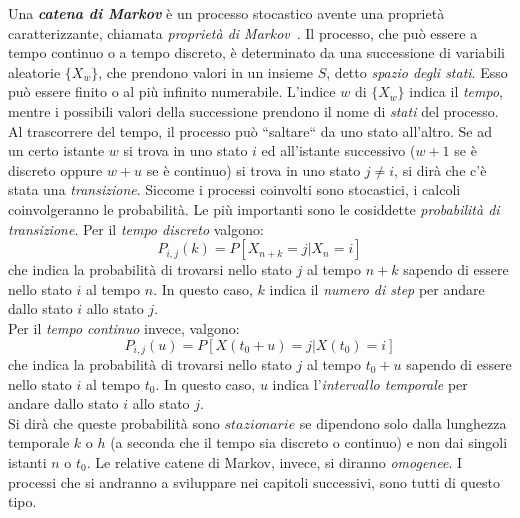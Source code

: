 Una \textit{\textbf{catena di Markov}} \`e un processo stocastico avente una proprietà caratterizzante, chiamata \textit{proprietà di Markov}~\cite{libro:tele}.  Il processo, che può essere a tempo continuo o a tempo discreto, \`e determinato da una successione di variabili aleatorie $\{X_w\}$, che prendono valori in un insieme $S$, detto \textit{spazio degli stati}. Esso può essere finito o al più infinito numerabile. 
L’indice $w$ di $\{X_w\}$ indica il \textit{tempo}, mentre i possibili valori della successione prendono il nome di \textit{stati} del processo.
Al trascorrere del tempo, il processo può “saltare“ da uno stato all’altro. Se ad un certo istante $w$ si trova in uno stato $i$ ed all’istante successivo ($w+1$ se \`e discreto oppure $w+u$ se \`e continuo) si trova in uno stato $j \neq i$, si dirà che c’\`e stata una \textit{transizione}.
Siccome i processi coinvolti sono stocastici, i calcoli coinvolgeranno le probabilità. Le più importanti sono le cosiddette \textit{probabilità di transizione}. Per il \textit{tempo discreto} valgono:
\begin{equation}P_{i,j}(k)=P[X_{n+k}=j | X_n=i]\end{equation} 
che indica la probabilità di trovarsi nello stato $j$ al tempo $n+k$ sapendo di essere nello stato $i$ al tempo $n$. In questo caso, $k$ indica il \textit{numero di step} per andare dallo stato $i$ allo stato $j$.\\
Per il \textit{tempo continuo} invece, valgono:
\begin{equation}P_{i,j}(u)=P[X(t_0+u)=j | X(t_0)=i]\end{equation} 
che indica la probabilità di trovarsi nello stato $j$ al tempo $t_0+u$ sapendo di essere nello stato $i$ al tempo $t_0$. In questo caso, $u$ indica l'\textit{intervallo temporale} per andare dallo stato $i$ allo stato $j$.\\
Si dirà che queste probabilità sono $stazionarie$ se dipendono solo dalla lunghezza temporale $k$ o $h$ (a seconda che il tempo sia discreto o continuo) e non dai singoli istanti $n$ o $t_0$. Le relative catene di Markov, invece, si diranno \textit{omogenee}. I processi che si andranno a sviluppare nei capitoli successivi, sono tutti di questo tipo.

